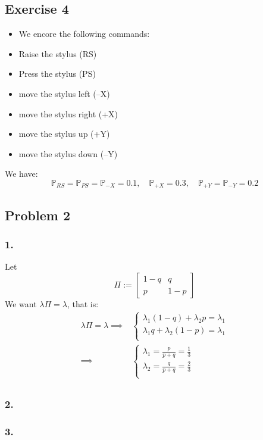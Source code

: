 \documentclass{article}
\newcommand{\1}{\mathbf{1}}
\renewcommand{\P}{\mathbb{P}}
\begin{document}
\subsection{Exercise 4}
\begin{itemize}
  \item We encore the following commands:
  \item Raise the stylus (RS)
  \item Press the stylus (PS)
  \item move the stylus left (–X)
  \item move the stylus right (+X)
  \item move the stylus up (+Y)
  \item move the stylus down (–Y)
\end{itemize}
We have:
$$
  \P_{RS} = \P_{PS} = \P_{-X} = 0.1, \quad \P_{+X} = 0.3, \quad \P_{+Y} = \P_{-Y} = 0.2
$$
\subsection{Problem 2}
\subsubsection{1.}
Let
$$
  \Pi :=
  \begin{bmatrix}
    1-q & q   \\
    p   & 1-p
  \end{bmatrix}
$$
We want $\lambda \Pi = \lambda$, that is:
\begin{align*}
  \lambda \Pi = \lambda
  \implies &
  \begin{cases}
    \lambda_1 (1-q) + \lambda_2 p = \lambda_1 \\
    \lambda_1 q + \lambda_2 (1-p) = \lambda_1 \\
  \end{cases} \\
  \implies &
  \begin{cases}
    \lambda_1 = \frac{p}{p + q} = \frac{1}{3} \\
    \lambda_2 = \frac{q}{p + q} = \frac{2}{3} \\
  \end{cases} \\
\end{align*}

\subsubsection{2.}
\subsubsection{3.}
\end{document}
